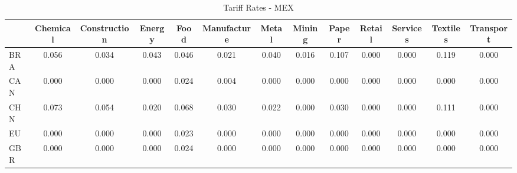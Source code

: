 \begin{table}[htbp]
\centering
\caption{Tariff Rates - MEX} 
\label{tab:tariff_MEX}
\begin{tabular}{lcccccccccccc}
  \hline
 & Chemical & Construction & Energy & Food & Manufacture & Metal & Mining & Paper & Retail & Services & Textiles & Transport \\ 
  \hline
BRA & \textcolor[RGB]{32,21,223}{0.056} & \textcolor[RGB]{49,32,206}{0.034} & \textcolor[RGB]{38,25,217}{0.043} & \textcolor[RGB]{36,23,219}{0.046} & \textcolor[RGB]{72,47,183}{0.021} & \textcolor[RGB]{40,26,215}{0.040} & \textcolor[RGB]{81,52,174}{0.016} & \textcolor[RGB]{11,7,244}{0.107} & \textcolor[RGB]{255,165,0}{0.000} & \textcolor[RGB]{255,165,0}{0.000} & \textcolor[RGB]{4,3,251}{0.119} & \textcolor[RGB]{255,165,0}{0.000} \\ 
  CAN & \textcolor[RGB]{255,165,0}{0.000} & \textcolor[RGB]{255,165,0}{0.000} & \textcolor[RGB]{255,165,0}{0.000} & \textcolor[RGB]{62,40,193}{0.024} & \textcolor[RGB]{102,66,153}{0.004} & \textcolor[RGB]{255,165,0}{0.000} & \textcolor[RGB]{255,165,0}{0.000} & \textcolor[RGB]{255,165,0}{0.000} & \textcolor[RGB]{255,165,0}{0.000} & \textcolor[RGB]{255,165,0}{0.000} & \textcolor[RGB]{255,165,0}{0.000} & \textcolor[RGB]{255,165,0}{0.000} \\ 
  CHN & \textcolor[RGB]{21,14,234}{0.073} & \textcolor[RGB]{34,22,221}{0.054} & \textcolor[RGB]{77,50,178}{0.020} & \textcolor[RGB]{25,16,230}{0.068} & \textcolor[RGB]{53,34,202}{0.030} & \textcolor[RGB]{70,45,185}{0.022} & \textcolor[RGB]{255,165,0}{0.000} & \textcolor[RGB]{51,33,204}{0.030} & \textcolor[RGB]{255,165,0}{0.000} & \textcolor[RGB]{255,165,0}{0.000} & \textcolor[RGB]{8,5,246}{0.111} & \textcolor[RGB]{255,165,0}{0.000} \\ 
  EU & \textcolor[RGB]{110,72,144}{0.000} & \textcolor[RGB]{255,165,0}{0.000} & \textcolor[RGB]{255,165,0}{0.000} & \textcolor[RGB]{66,43,189}{0.023} & \textcolor[RGB]{255,165,0}{0.000} & \textcolor[RGB]{255,165,0}{0.000} & \textcolor[RGB]{255,165,0}{0.000} & \textcolor[RGB]{255,165,0}{0.000} & \textcolor[RGB]{255,165,0}{0.000} & \textcolor[RGB]{255,165,0}{0.000} & \textcolor[RGB]{255,165,0}{0.000} & \textcolor[RGB]{255,165,0}{0.000} \\ 
  GBR & \textcolor[RGB]{108,70,147}{0.000} & \textcolor[RGB]{255,165,0}{0.000} & \textcolor[RGB]{255,165,0}{0.000} & \textcolor[RGB]{64,41,191}{0.024} & \textcolor[RGB]{255,165,0}{0.000} & \textcolor[RGB]{255,165,0}{0.000} & \textcolor[RGB]{255,165,0}{0.000} & \textcolor[RGB]{255,165,0}{0.000} & \textcolor[RGB]{255,165,0}{0.000} & \textcolor[RGB]{255,165,0}{0.000} & \textcolor[RGB]{255,165,0}{0.000} & \textcolor[RGB]{255,165,0}{0.000} \\ 

\end{tabular}
\end{table}

